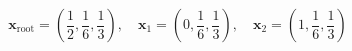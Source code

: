 $$
\mathbf x_{\mathrm{root}} = \left(\frac{1}{2}, \frac{1}{6}, \frac{1}{3}\right),\quad \mathbf x_{1} = \left(0, \frac{1}{6}, \frac{1}{3}\right),\quad \mathbf x_{2} = \left(1, \frac{1}{6}, \frac{1}{3}\right)
$$
